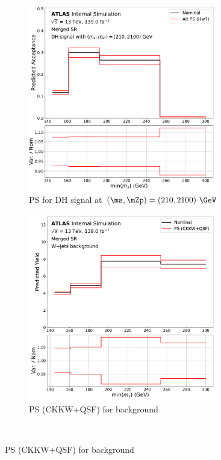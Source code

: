 \begin{figure}
  \begin{subfigure}{0.45\textwidth}
      \centering
    \includegraphics[width=0.9\textwidth]{Figures/6/2pt_MGHw7_syst_monoSWWsemilep_zp2100_dm200_dh210_SR_mgd_TARJets10_minmS_mgd.pdf}
    \caption{PS for DH signal at \((\ms, \mZp)=(210, 2100)~\GeV\)}
    \label{fig:DH_PS}
  \end{subfigure} \hspace{1em}
  \begin{subfigure}{0.45\textwidth}
      \centering
    \includegraphics[width=0.9\textwidth]{Figures/6/ckkw_plus_qsf_syst_W+Jets_SR_mgd_TARJets10_minmS_mgd_yield.pdf}
    \caption{PS (CKKW+QSF) for \wjets background}
    \label{fig:wjets_PS}
  \end{subfigure} \\ \vspace{1em}
  

\end{figure}
